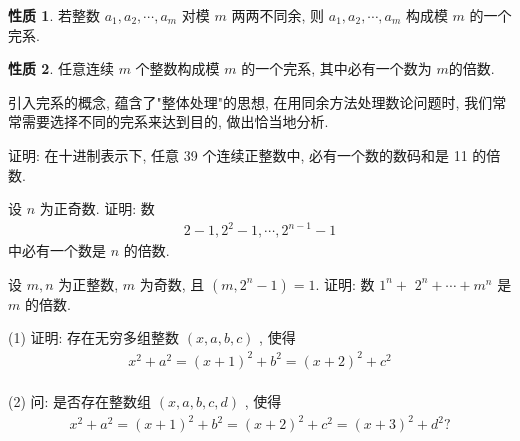 \documentclass[aspectratio=169]{ctexbeamer}
\theoremstyle{definition}
\newtheorem{property}{性质}[section]
\begin{document}
\begin{frame}
	\begin{property}
		若整数 $a_{1}, a_{2}, \cdots, a_{m}$ 对模 $m$ 两两不同余, 则 $a_{1}, a_{2}, \cdots, a_{m}$ 构成模 $m$ 的一个完系.
	\end{property}

	\begin{property}
		任意连续 $m$ 个整数构成模 $m$ 的一个完系, 其中必有一个数为 $m$的倍数.
	\end{property}
	引入完系的概念, 蕴含了"整体处理"的思想, 在用同余方法处理数论问题时, 我们常常需要选择不同的完系来达到目的, 做出恰当地分析.
\end{frame}

\begin{frame}[t]
	\begin{example}
		证明: 在十进制表示下, 任意 39 个连续正整数中, 必有一个数的数码和是 11 的倍数.
	\end{example}
\end{frame}

\begin{frame}[t]
	\begin{example}
		设 $n$ 为正奇数. 证明: 数
		\begin{align*}
			2-1,2^{2}-1, \cdots, 2^{n-1}-1
		\end{align*}
		中必有一个数是 $n$ 的倍数.
	\end{example}
\end{frame}

\begin{frame}[t]
	\begin{example}
		设 $m ,  n$ 为正整数, $m$ 为奇数, 且 $\left(m, 2^{n}-1\right)=1$. 证明: 数 $1^{n}+$ $2^{n}+\cdots+m^{n}$ 是 $m$ 的倍数.
	\end{example}
\end{frame}

\begin{frame}[t]
	\begin{example}
		(1) 证明: 存在无穷多组整数 $(x, a, b, c)$ , 使得
		\begin{align*}
			x^{2}+a^{2}=(x+1)^{2}+b^{2}=(x+2)^{2}+c^{2}
		\end{align*}\\
		(2) 问: 是否存在整数组 $(x, a, b, c, d)$ , 使得
		\begin{align*}
			x^{2}+a^{2}=(x+1)^{2}+b^{2}=(x+2)^{2}+c^{2}=(x+3)^{2}+d^{2} ?
		\end{align*}
	\end{example}
\end{frame}
\end{document}
